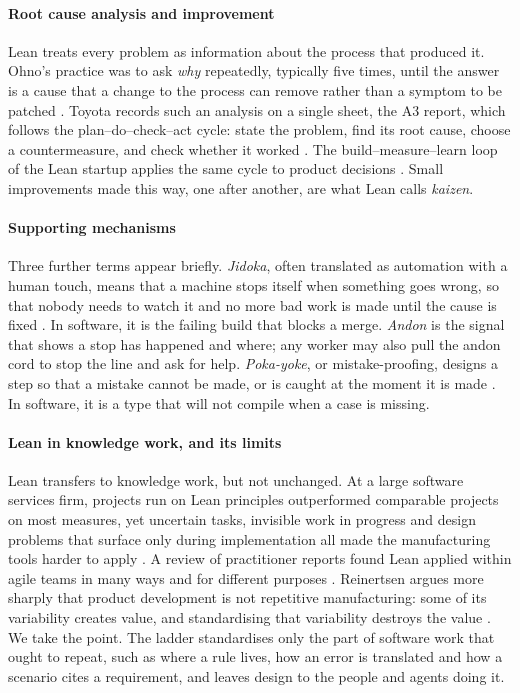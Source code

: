 \paragraph{Root cause analysis and improvement} Lean treats every problem as information about the
process that produced it. Ohno's practice was to ask \emph{why} repeatedly, typically five times,
until the answer is a cause that a change to the process can remove rather than a symptom to be
patched \citep{ohno1988tps}. Toyota records such an analysis on a single sheet, the A3 report,
which follows the plan--do--check--act cycle: state the problem, find its root cause, choose a
countermeasure, and check whether it worked \citep{sobek2008a3}. The build--measure--learn loop of
the Lean startup applies the same cycle to product decisions \citep{ries2011lean}. Small
improvements made this way, one after another, are what Lean calls \emph{kaizen}.

\paragraph{Supporting mechanisms} Three further terms appear briefly. \emph{Jidoka}, often
translated as automation with a human touch, means that a machine stops itself when something
goes wrong, so that nobody needs to watch it and no more bad work is made until the cause is
fixed \citep{ohno1988tps}. In software, it is the failing build that blocks a merge. \emph{Andon}
is the signal that shows a stop has happened and where; any worker may also pull the andon cord to
stop the line and ask for help. \emph{Poka-yoke}, or mistake-proofing, designs a step so that a
mistake cannot be made, or is caught at the moment it is made \citep{shingo1986zqc}. In software,
it is a type that will not compile when a case is missing.

\paragraph{Lean in knowledge work, and its limits} Lean transfers to knowledge work, but not
unchanged. At a large software services firm, projects run on Lean principles outperformed
comparable projects on most measures, yet uncertain tasks, invisible work in progress and design
problems that surface only during implementation all made the manufacturing tools harder to apply
\citep{staats2011lean}. A review of practitioner reports found Lean applied within agile teams in
many ways and for different purposes \citep{wang2012leagile}. Reinertsen argues more sharply that
product development is not repetitive manufacturing: some of its variability creates value, and
standardising that variability destroys the value \citep{reinertsen2009principles}. We take the
point. The ladder standardises only the part of software work that ought to repeat, such as where
a rule lives, how an error is translated and how a scenario cites a requirement, and leaves design
to the people and agents doing it.

